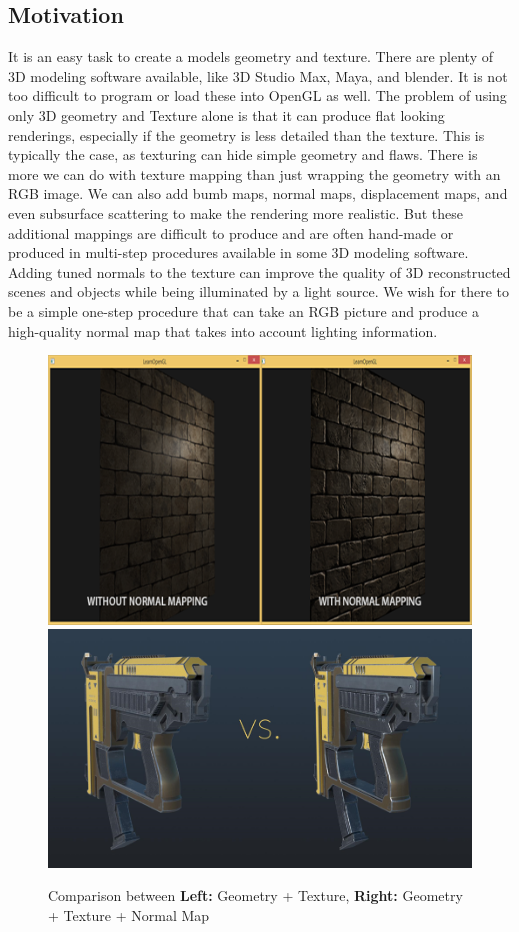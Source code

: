 \documentclass[10pt,twocolumn,letterpaper]{article}
\begin{document}
\subsection{Motivation}
It is an easy task to create a models geometry and texture. There are plenty of 3D modeling software available, like 3D Studio Max, Maya, and blender. It is not too difficult to program or load these into OpenGL as well. The problem of using only 3D geometry and Texture alone is that it can produce flat looking renderings, especially if the geometry is less detailed than the texture. This is typically the case, as texturing can hide simple geometry and flaws. There is more we can do with texture mapping than just wrapping the geometry with an RGB image. We can also add bumb maps, normal maps, displacement maps, and even subsurface scattering to make the rendering more realistic. But these additional mappings are difficult to produce and are often hand-made or produced in multi-step procedures available in some 3D modeling software. Adding tuned normals to the texture can improve the quality of 3D reconstructed scenes and objects while being illuminated by a light source. We wish for there to be a simple one-step procedure that can take an RGB picture and produce a high-quality normal map that takes into account lighting information.

\begin{figure}[h]
	\begin{center}
		\includegraphics [scale=0.30] {image/wall.png}
		\includegraphics [scale=0.30] {image/gun.png}
	\end{center}
	\caption{Comparison between \textbf{Left:} Geometry + Texture, \textbf{Right:} Geometry + Texture + Normal Map}
	\label{fig:compare}
\end{figure} 
\end{document}
